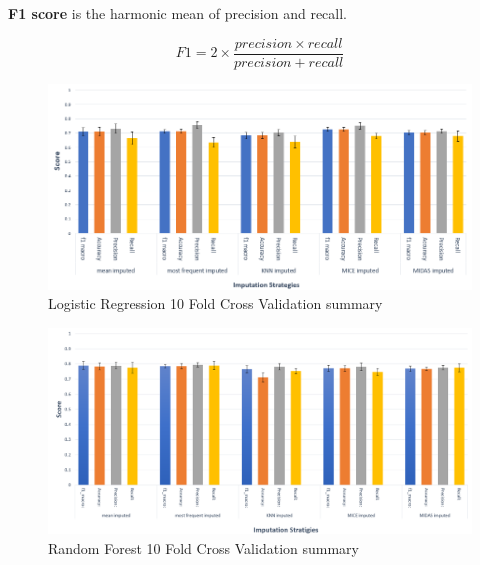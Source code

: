\documentclass{l4proj}
\begin{document}
\textbf{F1 score} is the harmonic mean of precision and recall.

\begin{equation} \label{eq:4}
F1= 2 \times \frac{precision \times recall}{precision + recall}
\end{equation}

\begin{figure}[!htb]
  \caption{Logistic Regression 10 Fold Cross Validation summary}
  \includegraphics[width=\textwidth]{dissertation/Latex/images/Classification Results/lg_metrics.PNG}
\end{figure}

\begin{figure}[!htb]
  \caption{Random Forest 10 Fold Cross Validation summary}
  \includegraphics[width=\textwidth]{dissertation/Latex/images/Classification Results/10cv_rf.PNG}
\end{figure}
 
\end{document}
